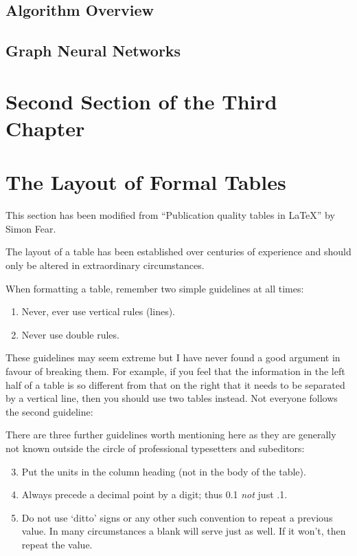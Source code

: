 \subsection{Algorithm Overview}

\subsection{Graph Neural Networks}

\subsection{}

\section{Second Section of the Third Chapter}

\section{The Layout of Formal Tables}
This section has been modified from ``Publication quality tables in \LaTeX*''
 by Simon Fear.

The layout of a table has been established over centuries of experience and
should only be altered in extraordinary circumstances.

When formatting a table, remember two simple guidelines at all times:

\begin{enumerate}
  \item Never, ever use vertical rules (lines).
  \item Never use double rules.
\end{enumerate}

These guidelines may seem extreme but I have
never found a good argument in favour of breaking them. For
example, if you feel that the information in the left half of
a table is so different from that on the right that it needs
to be separated by a vertical line, then you should use two
tables instead. Not everyone follows the second guideline:

There are three further guidelines worth mentioning here as they
are generally not known outside the circle of professional
typesetters and subeditors:

\begin{enumerate}\setcounter{enumi}{2}
  \item Put the units in the column heading (not in the body of
          the table).
  \item Always precede a decimal point by a digit; thus 0.1
      {\em not} just .1.
  \item Do not use `ditto' signs or any other such convention to
      repeat a previous value. In many circumstances a blank
      will serve just as well. If it won't, then repeat the value.
\end{enumerate}

